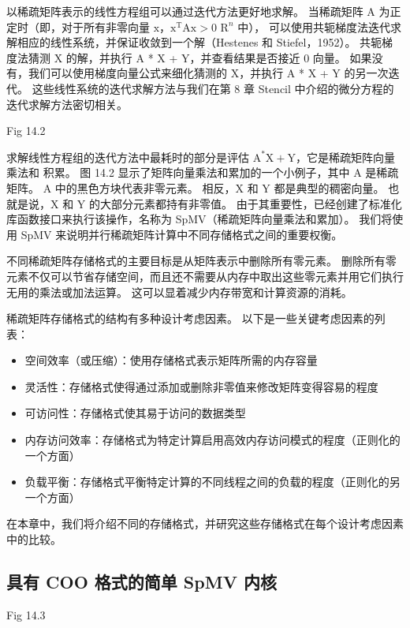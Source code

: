 以稀疏矩阵表示的线性方程组可以通过迭代方法更好地求解。 
当稀疏矩阵 $\mathrm{A}$ 为正定时（即，对于所有非零向量 
$\mathrm{x}$，$\mathrm{x}^{\mathrm{T}} \mathrm{Ax}>0$ $\mathrm{R}^{n}$ 中），
可以使用共轭梯度法迭代求解相应的线性系统，并保证收敛到一个解（Hestenes 和 Stiefel，1952）。 
共轭梯度法猜测 X 的解，并执行 A * X + Y，并查看结果是否接近 0 向量。 
如果没有，我们可以使用梯度向量公式来细化猜测的 X，并执行 A * X + Y 的另一次迭代。
这些线性系统的迭代求解方法与我们在第 8 章 Stencil 中介绍的微分方程的迭代求解方法密切相关。

{\color{red} Fig 14.2}

求解线性方程组的迭代方法中最耗时的部分是评估 $\mathrm{A}^{*} \mathrm{X}+\mathrm{Y}$，它是稀疏矩阵向量乘法和 积累。 
图 14.2 显示了矩阵向量乘法和累加的一个小例子，其中 A 是稀疏矩阵。 
$\mathrm{A}$ 中的黑色方块代表非零元素。 相反，$\mathrm{X}$ 和 $\mathrm{Y}$ 都是典型的稠密向量。 
也就是说，$\mathrm{X}$ 和 $\mathrm{Y}$ 的大部分元素都持有非零值。 
由于其重要性，已经创建了标准化库函数接口来执行该操作，名称为 SpMV（稀疏矩阵向量乘法和累加）。 
我们将使用 SpMV 来说明并行稀疏矩阵计算中不同存储格式之间的重要权衡。

不同稀疏矩阵存储格式的主要目标是从矩阵表示中删除所有零元素。 
删除所有零元素不仅可以节省存储空间，而且还不需要从内存中取出这些零元素并用它们执行无用的乘法或加法运算。 
这可以显着减少内存带宽和计算资源的消耗。

稀疏矩阵存储格式的结构有多种设计考虑因素。 以下是一些关键考虑因素的列表：
\begin{itemize}
   \item 空间效率（或压缩）：使用存储格式表示矩阵所需的内存容量

   \item 灵活性：存储格式使得通过添加或删除非零值来修改矩阵变得容易的程度

   \item 可访问性：存储格式使其易于访问的数据类型

   \item 内存访问效率：存储格式为特定计算启用高效内存访问模式的程度（正则化的一个方面）

   \item 负载平衡：存储格式平衡特定计算的不同线程之间的负载的程度（正则化的另一个方面）

\end{itemize}

在本章中，我们将介绍不同的存储格式，并研究这些存储格式在每个设计考虑因素中的比较。

\subsection{具有 COO 格式的简单 SpMV 内核}
{\color{red} Fig 14.3}

